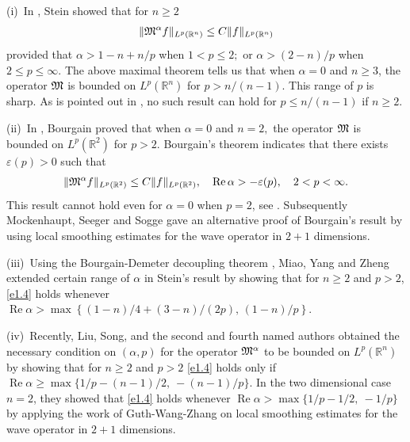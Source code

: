 \documentclass[11pt]{amsproc}
\newcommand{\R}{\mathbb{R}}
\newcommand{\0}{\mathbf{0}}
\renewcommand{\Re}{\mathop{\mathrm{Re}}}
\numberwithin{equation}{section}
\numberwithin{figure}{section}
\theoremstyle{definition}
\theoremstyle{remark}
\numberwithin{thm}{section}
\begin{document}
\smallskip
(i)\, In \cite[Theorem 2]{St2}, Stein showed that for $n\geq 2$
\begin{eqnarray}\label{e1.4}
\|	{\frak M}^{\alpha}  f \|_{L^p({\mathbb R^n})} \leq C\|f \|_{L^p({\mathbb R^n})}
\end{eqnarray}
provided that
$
\alpha>1-n+n/p$  when $1<p\leq 2;
$
or
$
\alpha>(2-n)/p$  when $2\leq p\leq \infty.
$
The above maximal theorem tells us  that    when  $\alpha=0$ and $n\geq 3$,  the    operator ${\frak  M} $ is bounded on $L^p({\mathbb R^n})$ for $p>n/(n-1)$.
This range of $p$ is sharp. As is pointed out in \cite{St2, St1}, no such result can hold for $p\leq  n/(n-1)$ if $n\geq 2$.

\smallskip


(ii)\, In \cite{Bo},  Bourgain   proved that  when  $\alpha=0$ and $n=2,$ the operator    ${\frak M} $ is bounded on $L^p{(\mathbb R^2)} $ for $p>2$.    Bourgain's theorem indicates that there exists $\varepsilon(p)>0$ such that
\begin{eqnarray}\label{e1.5}
\|	{\frak M}^{\alpha}  f \|_{L^p({\mathbb R^2})} \leq C\|f \|_{L^p({\mathbb R^2})}, \ \ \  \Re \alpha > -\varepsilon(p), \ \ \  2< p< \infty.
\end{eqnarray}
This result cannot hold even for $\alpha=0$ when $p=2$, see \cite{St2,St1}.
Subsequently Mockenhaupt, Seeger and Sogge \cite{MSS} gave an alternative proof of Bourgain's result by using local smoothing estimates for the wave operator in $2+1$ dimensions.

\smallskip


(iii)\, Using  the Bourgain-Demeter decoupling theorem \cite{BD}, Miao, Yang and Zheng \cite{MiYaZh} extended certain range of $\alpha$ in Stein's result \cite[Theorem 2]{St2} by showing that for $  n\geq 2$ and $p>2$,  \eqref{e1.4} holds
whenever
$
\Re\alpha >\max\left\{{ (1-n)/4} +{(3-n)/(2p)}, \,  {(1-n)/p} \right\}.
$


\smallskip

(iv)\, Recently,   Liu,  Song,   and the second and  fourth named authors  \cite{LiShSoYa} obtained the necessary condition on $(\alpha,p)$ for the   operator $	{\frak M}^\alpha$ to be bounded on $L^p(\R^n)$ by showing that for $n\geq 2$ and $p>2$ \eqref{e1.4}
holds only if
$
\Re\alpha \geq   \max \{1/p-(n-1)/2,\ -(n-1)/p \}.
$
In the two dimensional case   $n=2$, they showed  that  \eqref{e1.4} holds    whenever   $\Re\alpha>\max\{1/p-1/2,\ -1/p\}$  by applying    the work  of Guth-Wang-Zhang \cite{GWZ} on  local smoothing estimates for the wave operator  in $2+1$ dimensions.
\end{document}
